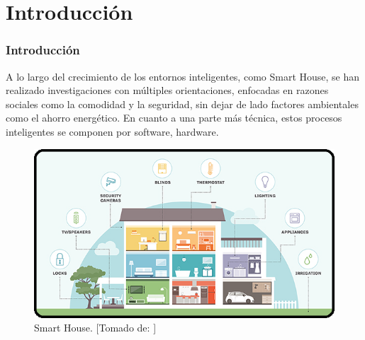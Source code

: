 \section{Introducción}
\begin{frame}
\frametitle{Introducción}
\footnotesize
 A lo largo del crecimiento de los entornos inteligentes, como Smart House, se han realizado investigaciones con múltiples orientaciones, enfocadas en razones sociales como la comodidad y la seguridad, sin dejar de lado factores ambientales como el ahorro energético. En cuanto a una parte más técnica, estos procesos inteligentes se componen por software, hardware.
 
 \begin{figure}[!]
 	\centering
 	\caption{Smart House. [Tomado de: \cite{PicSH}]}
 	\label{fig:intr}
 	\includegraphics[width=0.57\linewidth]{Imagenes/intro}
 \end{figure}
\end{frame}